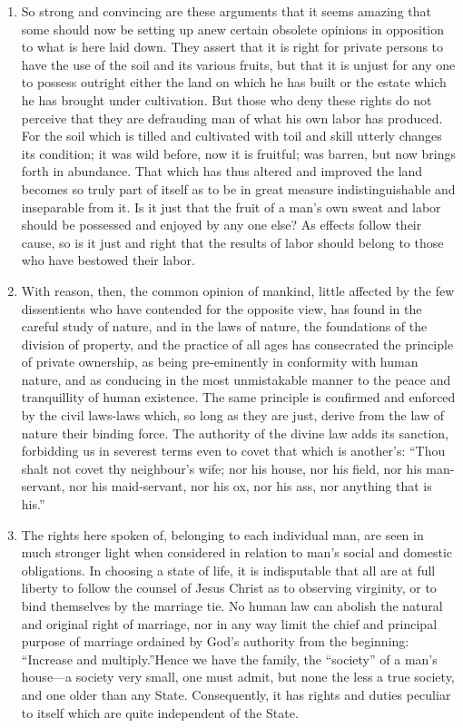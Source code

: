 \documentclass{book}
\begin{document}
\begin{enumerate}
	\item So strong and convincing are these arguments that it seems amazing that some should now be setting up anew certain obsolete opinions in opposition to what is here laid down. They assert that it is right for private persons to have the use of the soil and its various fruits, but that it is unjust for any one to possess outright either the land on which he has built or the estate which he has brought under cultivation. But those who deny these rights do not perceive that they are defrauding man of what his own labor has produced. For the soil which is tilled and cultivated with toil and skill utterly changes its condition; it was wild before, now it is fruitful; was barren, but now brings forth in abundance. That which has thus altered and improved the land becomes so truly part of itself as to be in great measure indistinguishable and inseparable from it. Is it just that the fruit of a man’s own sweat and labor should be possessed and enjoyed by any one else? As effects follow their cause, so is it just and right that the results of labor should belong to those who have bestowed their labor.


	\item With reason, then, the common opinion of mankind, little affected by the few dissentients who have contended for the opposite view, has found in the careful study of nature, and in the laws of nature, the foundations of the division of property, and the practice of all ages has consecrated the principle of private ownership, as being pre-eminently in conformity with human nature, and as conducing in the most unmistakable manner to the peace and tranquillity of human existence. The same principle is confirmed and enforced by the civil laws-laws which, so long as they are just, derive from the law of nature their binding force. The authority of the divine law adds its sanction, forbidding us in severest terms even to covet that which is another’s: “Thou shalt not covet thy neighbour’s wife; nor his house, nor his field, nor his man-servant, nor his maid-servant, nor his ox, nor his ass, nor anything that is his.”\footnotemark[1]


	\item The rights here spoken of, belonging to each individual man, are seen in much stronger light when considered in relation to man’s social and domestic obligations. In choosing a state of life, it is indisputable that all are at full liberty to follow the counsel of Jesus Christ as to observing virginity, or to bind themselves by the marriage tie. No human law can abolish the natural and original right of marriage, nor in any way limit the chief and principal purpose of marriage ordained by God’s authority from the beginning: “Increase and multiply.”\footnotemark[2] Hence we have the family, the “society” of a man’s house—a society very small, one must admit, but none the less a true society, and one older than any State. Consequently, it has rights and duties peculiar to itself which are quite independent of the State.



\end{enumerate}
\end{document}
